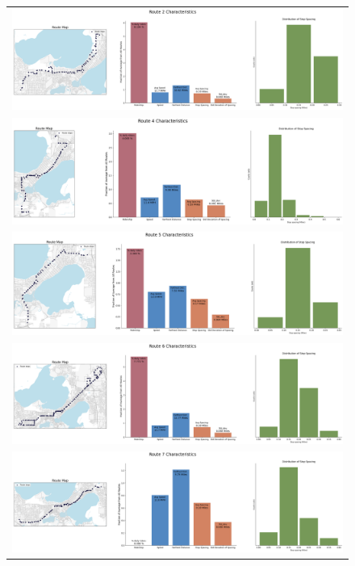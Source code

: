 \documentclass[letter]{article}
\begin{document}
\begin{figure}
\begin{center}
\begin{tabular}{ c }

  \includegraphics[width=150mm]{Route_2.png}  \\
  \includegraphics[width=150mm]{Route_4.png}  \\
  \includegraphics[width=150mm]{Route_5.png}  \\
  \includegraphics[width=150mm]{Route_6.png} \\
  \includegraphics[width=150mm]{Route_7.png}  \\
  
  \end{tabular}
\end{center}
\end{figure}
\end{document}
